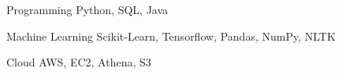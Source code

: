 

\begin{cvskills}

  \cvskill
    {Programming} %
    {Python, SQL, Java} %

  \cvskill
    {Machine Learning} %
    {Scikit-Learn, Tensorflow, Pandas, NumPy, NLTK} %

  \cvskill
    {Cloud} %
    {AWS, EC2, Athena, S3} %

\end{cvskills}